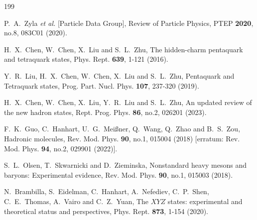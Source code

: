 \documentclass[prl,twocolumn,floatfix,amsmath,nofootinbib,amssymb,floatfix]{revtex4}
\begin{document}
\begin{thebibliography}{199}

P.~A.~Zyla \textit{et al.} [Particle Data Group],
Review of Particle Physics,
PTEP \textbf{2020}, no.8, 083C01 (2020).


H.~X.~Chen, W.~Chen, X.~Liu and S.~L.~Zhu,
The hidden-charm pentaquark and tetraquark states,
Phys. Rept. \textbf{639}, 1-121 (2016).

Y.~R.~Liu, H.~X.~Chen, W.~Chen, X.~Liu and S.~L.~Zhu,
Pentaquark and Tetraquark states,
Prog. Part. Nucl. Phys. \textbf{107}, 237-320 (2019).


H.~X.~Chen, W.~Chen, X.~Liu, Y.~R.~Liu and S.~L.~Zhu,
An updated review of the new hadron states,
Rept. Prog. Phys. \textbf{86}, no.2, 026201 (2023).

F.~K.~Guo, C.~Hanhart, U.~G.~Mei\ss{}ner, Q.~Wang, Q.~Zhao and B.~S.~Zou,
Hadronic molecules,
Rev. Mod. Phys. \textbf{90}, no.1, 015004 (2018)
[erratum: Rev. Mod. Phys. \textbf{94}, no.2, 029901 (2022)].


S.~L.~Olsen, T.~Skwarnicki and D.~Zieminska,
Nonstandard heavy mesons and baryons: Experimental evidence,
Rev. Mod. Phys. \textbf{90}, no.1, 015003 (2018).

N.~Brambilla, S.~Eidelman, C.~Hanhart, A.~Nefediev, C.~P.~Shen, C.~E.~Thomas, A.~Vairo and C.~Z.~Yuan,
The $XYZ$ states: experimental and theoretical status and perspectives,
Phys. Rept. \textbf{873}, 1-154 (2020).



\end{thebibliography}
\end{document}
